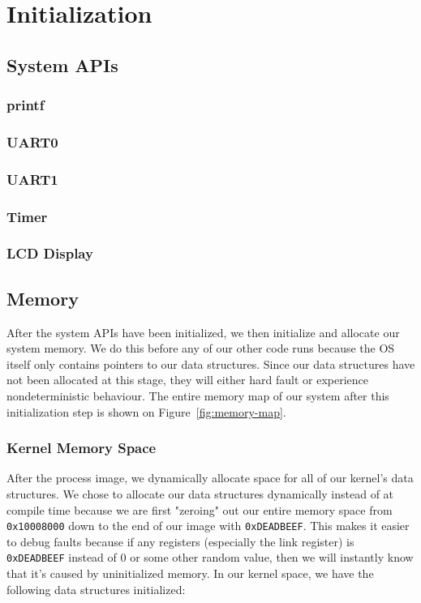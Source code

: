 \documentclass[12pt]{article}
\begin{document}
\section{Initialization}


\subsection{System APIs}


\subsubsection{printf}


\subsubsection{UART0}


\subsubsection{UART1}


\subsubsection{Timer}


\subsubsection{LCD Display}


\subsection{Memory}
After the system APIs have been initialized, we then initialize and allocate our system memory. We do this before any of our other code runs because the OS itself only contains pointers to our data structures. Since our data structures have not been allocated at this stage, they will either hard fault or experience nondeterministic behaviour. The entire memory map of our system after this initialization step is shown on Figure~\ref{fig:memory-map}. 

\subsubsection{Kernel Memory Space}

After the process image, we dynamically allocate space for all of our kernel's data structures. We chose to allocate our data structures dynamically instead of at compile time because we are first "zeroing" out our entire memory space from \texttt{0x10008000} down to the end of our image with \texttt{0xDEADBEEF}. This makes it easier to debug faults because if any registers (especially the link register) is \texttt{0xDEADBEEF} instead of 0 or some other random value, then we will instantly know that it's caused by uninitialized memory. In our kernel space, we have the following data structures initialized:
\end{document}
